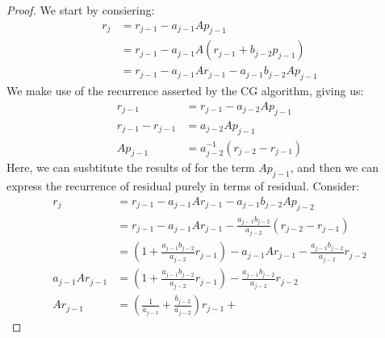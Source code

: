 \documentclass[]{article}
\theoremstyle{definition}
\begin{document}
            \begin{proof}
                We start by consiering: 
                \begin{align}
                    r_j &= r_{j - 1} - a_{j -1 }Ap_{j - 1}
                    \\
                    & =r_{j - 1} - a_{j - 1} A(r_{j - 1} + b_{j - 2}p_{j - 1})
                    \\
                    &= r_{j - 1} - a_{j - 1}Ar_{j - 1} - a_{j - 1}b_{j - 2}Ap_{j - 1}
                \end{align}
                We make use of the recurrence asserted by the CG algorithm, giving us: 
                \begin{align}
                    r_{j - 1} &= r_{j - 1} - a_{j - 2}Ap_{j - 1}
                    \\
                    r_{j - 1} - r_{j - 1} &= a_{j - 2} Ap_{j - 1}
                    \\
                    Ap_{j - 1} &= a^{-1}_{j -2} 
                    \left(
                        r_{j - 2} - r_{j - 1}
                    \right)
                \end{align}
                Here, we can susbtitute the results of for the term $Ap_{j - 1}$, and then we can express the recurrence of residual purely in terms of residual. Consider: 
                \begin{align}
                    r_{j} &= r_{j - 1} - a_{j - 1}Ar_{j - 1} - a_{j - 1}b_{j - 2}Ap_{j - 2}
                    \\
                    &= 
                    r_{j - 1} - a_{j - 1}Ar_{j - 1} - \frac{a_{j-1}b_{j-2}}{a_{j-2}}\left(
                        r_{j - 2} - r_{j - 1}
                    \right)
                    \\
                    &= \left(
                        1 + \frac{a_{j - 1}b_{j -2}}{a_{j - 2}}r_{j - 1}
                    \right)- a_{j - 1}Ar_{j - 1} - \frac{a_{j-1}b_{j-2}}{a_{j-2}}r_{j - 2}
                    \\
                    a_{j - 1}Ar_{j - 1} &= 
                    \left(
                        1 + \frac{a_{j - 1}b_{j -2}}{a_{j - 2}}r_{j - 1}
                    \right)
                    - \frac{a_{j-1}b_{j-2}}{a_{j-2}}r_{j - 2}
                    \\
                    Ar_{j - 1} &=
                    \left(
                        \frac{1}{a_{j - 1}} + \frac{b_{j - 2}}{a_{j- 2}}
                    \right)r_{j - 1} + 

\end{align}
\end{proof}
\end{document}
